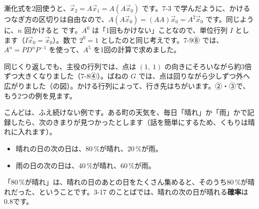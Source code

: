 漸化式を2回使うと、$\vec x_2=A\vec x_1=A(A\vec x_0)$ です。7-3 で学んだように、かけるつなぎ方の区切りは自由なので、$A(A\vec x_0)=(AA)\vec x_0=A^2\vec x_0$ です。同じように、$n$ 回かけると
です。$A^0$ は「1回もかけない」ことなので、単位行列 $I$ とします（$I\vec x_0=\vec x_0$）。数で $2^0=1$ としたのと同じ考えです。7-9⑧ では、$A^n=PD^nP^{-1}$ を使って、$A^5$ を1回の計算で求めました。

同じくり返しでも、主役の行列では、点は $(1,\ 1)$ の向きにそろいながら約3倍ずつ大きくなりました（7-8④）。ばねの $G$ では、点は回りながら少しずつ外へ広がりました（\bkhatenaref の図）。かける行列によって、行き先はちがいます。②・③で、もう2つの例を見ます。


\label{bk:7-10:tenki}こんどは、ふえ続けない例です。ある町の天気を、毎日「晴れ」か「雨」かで記録したら、次のきまりが見つかったとします（話を簡単にするため、くもりは晴れに入れます）。
\begin{itemize}[leftmargin=1.2\zw, itemsep=1pt, topsep=2pt, label={\color{\bkTT}●}]
\item 晴れの日の次の日は、80\,\%が晴れ、20\,\%が雨。
\item 雨の日の次の日は、40\,\%が晴れ、60\,\%が雨。
\end{itemize}
「80\,\%が晴れ」は、晴れの日のあとの日をたくさん集めると、そのうち80\,\%が晴れだった、ということです。3-17 のことばでは、晴れの次の日が晴れる\textbf{確率}は0.8です。

\begin{bkfigure}
\end{bkfigure}

